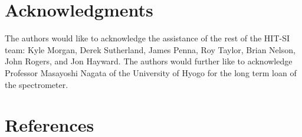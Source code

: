 \section{Acknowledgments}
The authors would like to acknowledge the assistance of the rest of the HIT-SI team: Kyle Morgan, Derek Sutherland, James Penna, Roy Taylor, Brian Nelson, John Rogers, and Jon Hayward. The authors would further like to acknowledge Professor Masayoshi Nagata of the University of Hyogo for the long term loan of the spectrometer.

\section{References}



